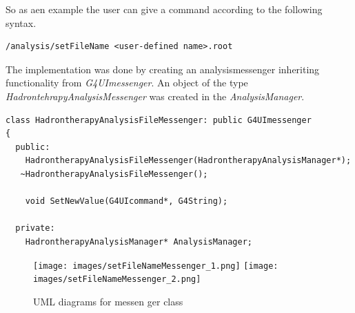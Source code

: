 So as aen example the user can give a command according to the following syntax.
\scriptsize
\begin{verbatim}
/analysis/setFileName <user-defined name>.root
\end{verbatim}
\normalsize

The implementation was done by creating an analysismessenger inheriting functionality from \textit{G4UImessenger}. An object of the type \textit{HadrontehrapyAnalysisMessenger} was created in the \textit{AnalysisManager}.


\scriptsize
\begin{verbatim}
class HadrontherapyAnalysisFileMessenger: public G4UImessenger
{
  public:
    HadrontherapyAnalysisFileMessenger(HadrontherapyAnalysisManager*);
   ~HadrontherapyAnalysisFileMessenger();
    
    void SetNewValue(G4UIcommand*, G4String);
    
  private:
    HadrontherapyAnalysisManager* AnalysisManager;
\end{verbatim}
\normalsize
\begin{figure}[h] 
\begin{center}
\texttt{[image: images/setFileNameMessenger\_1.png]}  
\texttt{[image: images/setFileNameMessenger\_2.png]}  
\caption{\label{fig:messengerUML} UML diagrams for messen ger class}
 
 \end{center}
 \end{figure}






